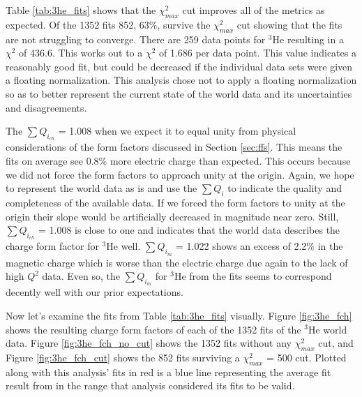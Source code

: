 Table \ref{tab:3he_fits} shows that the $\chi^2_{max}$ cut improves all of the metrics as expected. Of the 1352 fits 852, 63$\%$, survive the $\chi^2_{max}$ cut showing that the fits are not struggling to converge. There are 259 data points for $^3$He resulting in a $\chi^2$ of 436.6. This works out to a $\chi^2$ of 1.686 per data point. This value indicates a reasonably good fit, but could be decreased if the individual data sets were given a floating normalization. This analysis chose not to apply a floating normalization so as to better represent the current state of the world data and its uncertainties and disagreements.%

The $\sum Q_{i_{ch}}$ = 1.008 when we expect it to equal unity from physical considerations of the form factors discussed in Section \ref{sec:ffs}. This means the fits on average see 0.8$\%$ more electric charge than expected. This occurs because we did not force the form factors to approach unity at the origin. Again, we hope to represent the world data as is and use the $\sum Q_{i}$ to indicate the quality and completeness of the available data. If we forced the form factors to unity at the origin their slope would be artificially decreased in magnitude near zero. Still, $\sum Q_{i_{ch}}$ = 1.008 is close to one and indicates that the world data describes the charge form factor for $^3$He well. $\sum Q_{i_{m}}$ = 1.022 shows an excess of 2.2$\%$ in the magnetic charge which is worse than the electric charge due again to the lack of high $Q^2$ data. Even so, the $\sum Q_{i_{m}}$ for $^3$He from the fits seems to correspond decently well with our prior expectations. %

Now let's examine the fits from Table \ref{tab:3he_fits} visually. Figure \ref{fig:3he_fch} shows the resulting charge form factors of each of the 1352 fits of the $^3$He world data. Figure \ref{fig:3he_fch_no_cut} shows the 1352 fits without any $\chi^2_{max}$ cut, and Figure \ref{fig:3he_fch_cut} shows the 852 fits surviving a $\chi^2_{max}$ = 500 cut. Plotted along with this analysis' fits in red is a blue line representing the average fit result from \cite{Article:Amroun} in the range that analysis considered its fits to be valid. 

